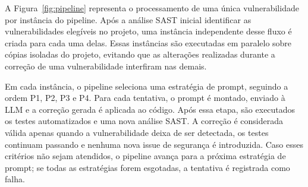 A Figura~\ref{fig:pipeline} representa o processamento de uma única vulnerabilidade por instância do pipeline. Após a análise SAST inicial identificar as vulnerabilidades elegíveis no projeto, uma instância independente desse fluxo é criada para cada uma delas. Essas instâncias são executadas em paralelo sobre cópias isoladas do projeto, evitando que as alterações realizadas durante a correção de uma vulnerabilidade interfiram nas demais.

Em cada instância, o pipeline seleciona uma estratégia de prompt, seguindo a ordem P1, P2, P3 e P4. Para cada tentativa, o prompt é montado, enviado à LLM e a correção gerada é aplicada ao código. Após essa etapa, são executados os testes automatizados e uma nova análise SAST. A correção é considerada válida apenas quando a vulnerabilidade deixa de ser detectada, os testes continuam passando e nenhuma nova issue de segurança é introduzida. Caso esses critérios não sejam atendidos, o pipeline avança para a próxima estratégia de prompt; se todas as estratégias forem esgotadas, a tentativa é registrada como falha.






